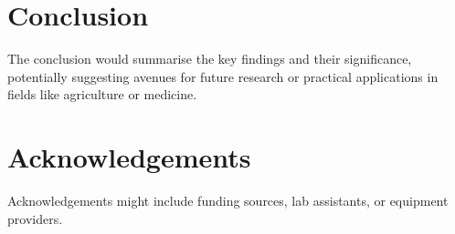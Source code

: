 \documentclass[a4paper]{article} 	%
\begin{document}
\section{Conclusion}
The conclusion would summarise the key findings and their significance, potentially suggesting avenues for future research or practical applications in fields like agriculture or medicine.

\section*{Acknowledgements}
Acknowledgements might include funding sources, lab assistants, or equipment providers.


\appendix



\renewcommand\bibname{References}%
\printbibliography
\end{document}
